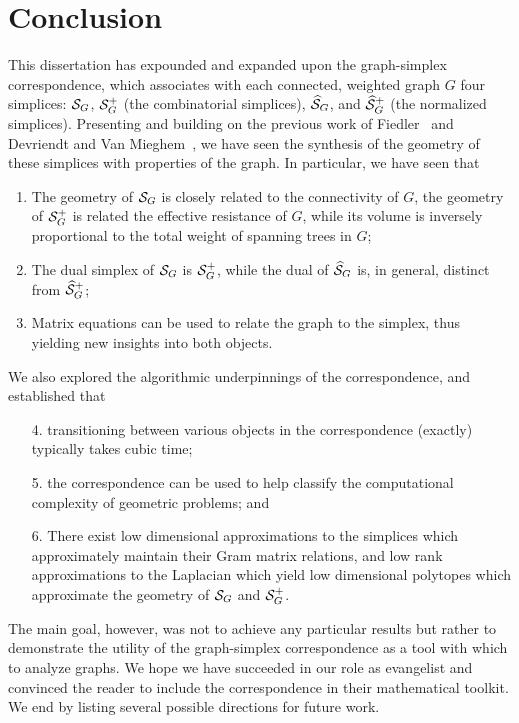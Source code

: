 \chapter{Conclusion}
\label{chap:conclusion}



This dissertation has expounded  and  expanded upon the graph-simplex correspondence, which associates with each connected, weighted graph $G$ four simplices: $\mathcal{S}_G$, $\mathcal{S}_G^+$ (the combinatorial simplices), $\widehat{\mathcal{S}}_G$, and $\widehat{\mathcal{S}}_G^+$ (the normalized simplices).  
Presenting and building on  the previous work of Fiedler~\cite{fiedler1993geometric,fiedler2011matrices} and Devriendt and Van Mieghem~\cite{devriendt2018simplex}, we have seen the synthesis of the geometry of these  simplices with properties of the graph. In particular, we have seen that 
\begin{enumerate}
	\item The geometry of $\mathcal{S}_G$ is closely related to  the connectivity of $G$, the geometry of  $\mathcal{S}_G^+$ is related the effective resistance of $G$, while its volume is inversely proportional to the total weight of spanning trees  in $G$; 
	\item The dual simplex of $\mathcal{S}_G$ is $\mathcal{S}_G^+$, while the  dual of $\widehat{\mathcal{S}}_G$ is, in general, distinct from $\widehat{\mathcal{S}}_G^+$; 
	\item Matrix equations can  be used to relate the graph to the  simplex,  thus yielding new insights into  both objects.  
\end{enumerate}

We also explored the  algorithmic underpinnings  of  the correspondence, and established that 
\begin{enumerate}
	\item[4.] transitioning between various objects in the correspondence (exactly) typically takes cubic time; 
	\item[5.] the correspondence can be used to help classify the computational complexity of geometric problems; and 
	\item[6.] There exist low dimensional  approximations  to the simplices which approximately maintain their Gram matrix relations, and low rank  approximations to the Laplacian  which yield low dimensional polytopes which approximate the geometry  of $\mathcal{S}_G$ and $\mathcal{S}_G^+$. 
\end{enumerate}
The main goal,  however,  was not to achieve any particular results but rather to demonstrate the utility of  the graph-simplex correspondence as  a tool with which  to  analyze  graphs. We hope we have succeeded in our role as evangelist and  convinced the reader to include the correspondence in their mathematical toolkit. We end  by listing several possible directions for future work. 

